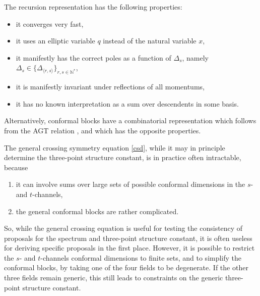 \documentclass[12pt, a4paper, notitlepage, twoside]{report}
\numberwithin{equation}{section}
\theoremstyle{break}
\begin{document}
The recursion representation has the following properties:
\begin{itemize}
 \item it converges very fast,
\item it uses an elliptic variable $q$ instead of the natural variable $x$,
\item it manifestly has the correct poles as a function of $\Delta_s$, namely $\Delta_s \in \{\Delta_{\langle r,s\rangle}\}_{r,s\in {\mathbb{N}}^*}$,
\item it is manifestly invariant under reflections of all momentums,
\item it has no known interpretation as a sum over descendents in some basis.
\end{itemize}
Alternatively, conformal blocks have a combinatorial representation which follows from the AGT relation \cite{aflt10}, and which has the opposite properties. 

The general crossing symmetry equation \eqref{csd}, while it may in principle determine the three-point structure constant, is in practice often intractable, because
\begin{enumerate}
 \item it can involve sums over large sets of possible conformal dimensions in the $s$- and $t$-channels, 
 \item the general conformal blocks are rather complicated. 
\end{enumerate}
So, while the general crossing equation is useful for testing the consistency of proposals for the spectrum and three-point structure constant, it is often useless for deriving specific proposals in the first place. However, it is possible to restrict the $s$- and $t$-channels conformal dimensions to finite sets, and to simplify the conformal blocks, by taking one of the four fields to be degenerate. If the other three fields remain generic, this still leads to constraints on the generic three-point structure constant. 
\end{document}

